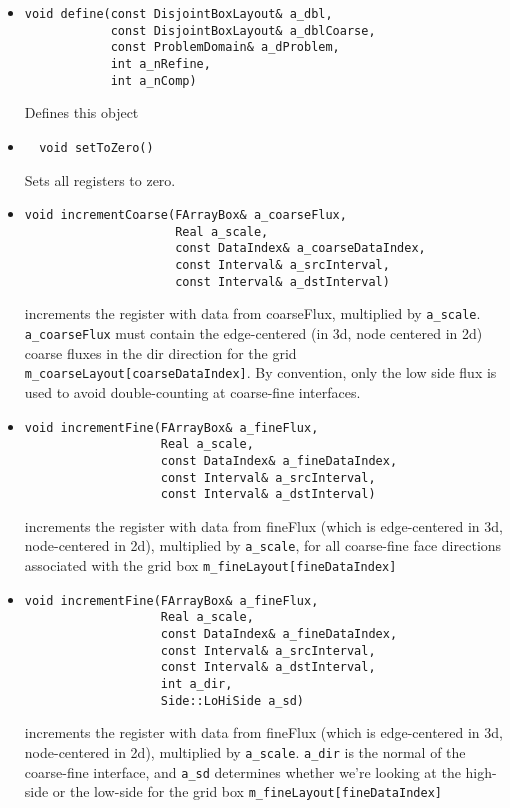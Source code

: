 \begin{itemize}
\item
\begin{verbatim}
void define(const DisjointBoxLayout& a_dbl,
            const DisjointBoxLayout& a_dblCoarse,
            const ProblemDomain& a_dProblem,
            int a_nRefine,
            int a_nComp)
\end{verbatim}
Defines this object


\item
\begin{verbatim}
  void setToZero()
\end{verbatim}
Sets all registers to zero.

\item
\begin{verbatim}
void incrementCoarse(FArrayBox& a_coarseFlux,
                     Real a_scale,
                     const DataIndex& a_coarseDataIndex,
                     const Interval& a_srcInterval,
                     const Interval& a_dstInterval)
\end{verbatim}
increments the register with data from coarseFlux, multiplied by
\verb/a_scale/. \verb/a_coarseFlux/ must contain the edge-centered (in 3d, node
centered in 2d) coarse fluxes in the dir direction for the grid        
\verb/m_coarseLayout[coarseDataIndex]/.
By convention, only the low side flux is used to avoid double-counting
at coarse-fine interfaces. 



\item
\begin{verbatim}
void incrementFine(FArrayBox& a_fineFlux,
                   Real a_scale,
                   const DataIndex& a_fineDataIndex,
                   const Interval& a_srcInterval,
                   const Interval& a_dstInterval)
\end{verbatim}
increments the register with data from fineFlux (which is edge-centered
in 3d, node-centered in 2d), multiplied by \verb/a_scale/, for all coarse-fine
face directions associated with the grid box \verb/m_fineLayout[fineDataIndex]/


\item
\begin{verbatim}
void incrementFine(FArrayBox& a_fineFlux,
                   Real a_scale,
                   const DataIndex& a_fineDataIndex,
                   const Interval& a_srcInterval,
                   const Interval& a_dstInterval,
                   int a_dir,
                   Side::LoHiSide a_sd)
\end{verbatim}
increments the register with data from fineFlux (which is edge-centered
in 3d, node-centered in 2d), multiplied by \verb/a_scale/.
\verb/a_dir/ is the normal of the coarse-fine interface, and
\verb/a_sd/ determines whether we're looking at the high-side or the
low-side for the grid box \verb/m_fineLayout[fineDataIndex]/



\end{itemize}

